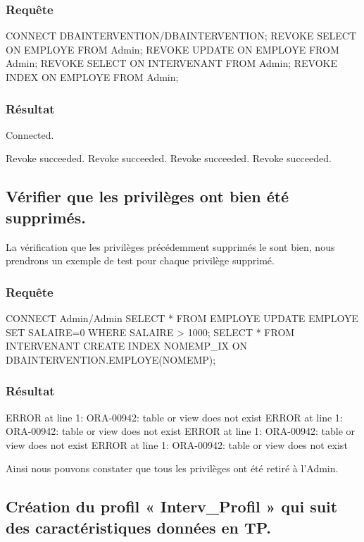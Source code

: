 \documentclass[•]{article}
\begin{document}
\subsubsection{Requête}
\begin{sql}
CONNECT DBAINTERVENTION/DBAINTERVENTION;
REVOKE SELECT ON EMPLOYE FROM Admin;
REVOKE UPDATE ON EMPLOYE FROM Admin;
REVOKE SELECT ON INTERVENANT FROM Admin;
REVOKE INDEX ON EMPLOYE FROM Admin;
\end{sql}
\subsubsection{Résultat}
\begin{sql}
Connected.	

Revoke succeeded.
Revoke succeeded.
Revoke succeeded.
Revoke succeeded.
\end{sql}
   

\subsection{Vérifier que les privilèges ont bien été supprimés.}
\textrm{La vérification que les privilèges précédemment supprimés le sont bien, nous prendrons un exemple de test pour chaque privilège supprimé.}
\subsubsection{Requête}
\begin{sql}
CONNECT Admin/Admin
SELECT * FROM EMPLOYE
UPDATE EMPLOYE SET SALAIRE=0 WHERE SALAIRE > 1000;
SELECT * FROM INTERVENANT
CREATE INDEX NOMEMP_IX ON DBAINTERVENTION.EMPLOYE(NOMEMP);
\end{sql}
\subsubsection{Résultat}
\begin{sql}
ERROR at line 1:
ORA-00942: table or view does not exist
ERROR at line 1:
ORA-00942: table or view does not exist
ERROR at line 1:
ORA-00942: table or view does not exist
ERROR at line 1:
ORA-00942: table or view does not exist
\end{sql}


\textrm{Ainsi nous pouvons constater que tous les privilèges ont été retiré à l'Admin.}


\subsection{Création du profil « Interv\_Profil » qui suit des caractéristiques données en TP.}
\end{document}
